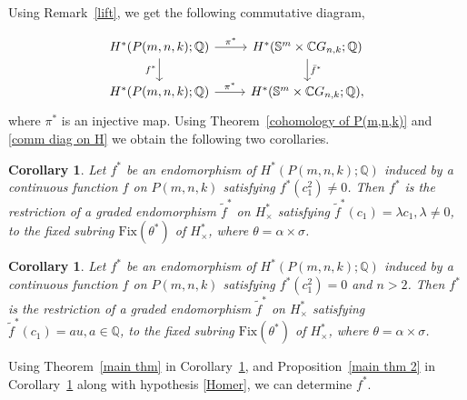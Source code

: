 \documentclass{amsart}
\newtheorem{corollary}[theorem]{Corollary}
\newcommand{\thmref}[1]{Theorem~\ref{#1}}
\newcommand{\propref}[1]{Proposition~\ref{#1}}
\newcommand{\corref}[1]{Corollary~\ref{#1}}
\newcommand{\remref}[1]{Remark~\ref{#1}}
\begin{document}
	Using \remref{lift}, we get the following commutative %
diagram,
	
	\begin{equation}\label{comm diag on H}
		\begin{tikzcd}
			{H^*(P(m,n,k);\mathbb Q)}  & {H^*(\mathbb S^m\times \mathbb CG_{n,k};\mathbb Q)} \\
			{H^*(P(m,n,k);\mathbb Q)} & {H^*(\mathbb S^m\times \mathbb CG_{n,k};\mathbb Q),}
			\arrow["{\pi^*}", from=1-1, to=1-2]
			\arrow["{f^*}"', from=1-1, to=2-1]
			\arrow["{\bar f^*}", from=1-2, to=2-2]
			\arrow["{\pi^*}", from=2-1, to=2-2]
		\end{tikzcd}
	\end{equation}
	where $\pi^*$ is an injective map. Using \thmref{cohomology of P(m,n,k)} and \eqref{comm diag on H} we obtain the following two corollaries. 
	\begin{corollary}\label{cor3}
		Let %
$f^*$ be an endomorphism of $H^*(P(m,n,k); \mathbb{Q})$ induced by a continuous function $f$ on $P(m,n,k)$ satisfying $f^*(c_1^2) \ne 0$. Then
		$f^*$ is the restriction of a graded endomorphism $\tilde{f}^*$ on  $H^*_\times$ satisfying $\tilde{f}^*(c_1) = \lambda c_1, \lambda \neq 0$,  to the fixed subring $\mathrm{Fix}(\theta^*)$ %
of $H^*_\times$, where %
$\theta = \alpha\times \sigma$.
	\end{corollary}
	\begin{corollary}\label{cor4}
		Let $f^*$ be an endomorphism of $H^*(P(m,n,k); \mathbb{Q})$ induced by a continuous function $f$ on $P(m,n,k)$ satisfying $f^*(c_1^2) =0$ and $n>2$. Then
		$f^*$ is the restriction of a graded endomorphism $\tilde{f}^*$ on  $H^*_\times$ satisfying $\tilde{f}^*(c_1) = au, a \in \mathbb{Q}$,  to the fixed subring $\mathrm{Fix}(\theta^*)$ %
of $H^*_\times$, where %
$\theta = \alpha\times \sigma$.
	\end{corollary}
	Using \thmref{main thm} in \corref{cor3}, and \propref{main thm 2} in \corref{cor4} along with hypothesis \eqref{Homer}, we can determine $f^*$.
	
\end{document}
